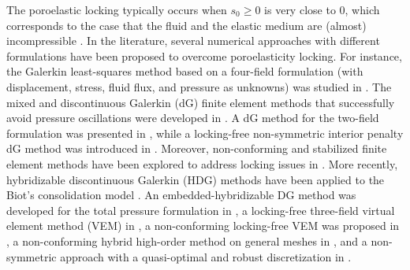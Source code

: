 \documentclass{amsart}
\begin{document}
The poroelastic locking typically occurs when $s_0 \ge 0$ is very close to $0$, which corresponds to the case that the fluid and the elastic medium are (almost) incompressible \cite{phillips2009}.
In the literature, several numerical approaches with different formulations have been proposed to overcome poroelasticity locking. For instance, the Galerkin least-squares method based on a four-field formulation (with displacement, stress, fluid flux, and pressure as unknowns) was studied in \cite{MR2177147}. The mixed and discontinuous Galerkin (dG) finite element methods that successfully avoid pressure oscillations were developed in \cite{phillips2008coupling}. A dG method for the two-field formulation was presented in \cite{MR3047799}, while a locking-free non-symmetric interior penalty dG method was introduced in \cite{MR3606362}. Moreover, non-conforming and stabilized finite element methods have been explored to address locking issues in \cite{MR3803860, MR3590654}. More recently, hybridizable discontinuous Galerkin (HDG) methods have been applied to the Biot’s consolidation model \cite{MR3907413}. An embedded-hybridizable DG method was developed for the total pressure formulation in \cite{MR4659441}, a locking-free three-field virtual element method (VEM) in \cite{MR4221326}, a non-conforming locking-free VEM was proposed in \cite{MR4636155}, 
 a non-conforming hybrid high-order method on general meshes in \cite{MR3504993}, and a non-symmetric approach with a quasi-optimal and robust discretization in \cite{MR4405491}.
\end{document}
